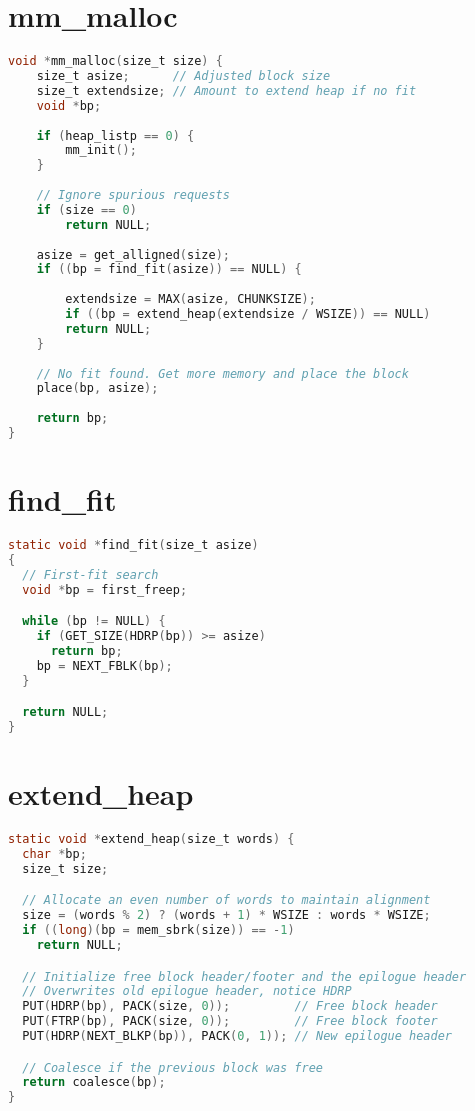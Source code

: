 \documentclass[11pt]{report}
\begin{document}
\section{mm\_malloc}\label{appendix:malloc_lab_code_mm_malloc}
\begin{lstlisting}[language=C]
void *mm_malloc(size_t size) {
    size_t asize;      // Adjusted block size 
    size_t extendsize; // Amount to extend heap if no fit 
    void *bp;
    
    if (heap_listp == 0) {
        mm_init();
    }
    
    // Ignore spurious requests 
    if (size == 0)
        return NULL;
    
    asize = get_alligned(size);
    if ((bp = find_fit(asize)) == NULL) {
    
        extendsize = MAX(asize, CHUNKSIZE);
        if ((bp = extend_heap(extendsize / WSIZE)) == NULL)
        return NULL;
    }
    
    // No fit found. Get more memory and place the block 
    place(bp, asize);
    
    return bp;
}
\end{lstlisting}

\section{find\_fit}\label{appendix:malloc_lab_code_find_fit}
\begin{lstlisting}[language=C]
static void *find_fit(size_t asize)
{
  // First-fit search 
  void *bp = first_freep;

  while (bp != NULL) {
    if (GET_SIZE(HDRP(bp)) >= asize)
      return bp;
    bp = NEXT_FBLK(bp);
  }

  return NULL;
}
\end{lstlisting}

\section{extend\_heap}\label{appendix:malloc_lab_code_extend_heap}
\begin{lstlisting}[language=C]
    static void *extend_heap(size_t words) {
  char *bp;
  size_t size;

  // Allocate an even number of words to maintain alignment 
  size = (words % 2) ? (words + 1) * WSIZE : words * WSIZE;
  if ((long)(bp = mem_sbrk(size)) == -1)
    return NULL;

  // Initialize free block header/footer and the epilogue header 
  // Overwrites old epilogue header, notice HDRP
  PUT(HDRP(bp), PACK(size, 0));         // Free block header 
  PUT(FTRP(bp), PACK(size, 0));         // Free block footer 
  PUT(HDRP(NEXT_BLKP(bp)), PACK(0, 1)); // New epilogue header 

  // Coalesce if the previous block was free 
  return coalesce(bp);
}
\end{lstlisting}
\end{document}
